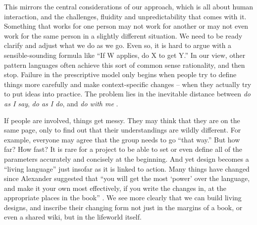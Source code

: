 
This mirrors the central considerations of our approach, which is all about human interaction, and the challenges, fluidity and unpredictability that comes with it.  Something that works for one person may not work for another or may not even work for the same person in a slightly different situation.  We need to be ready clarify and adjust what we do as we go.   Even so, it is hard to argue with a sensible-sounding formula like ``If W applies, do X to get Y.'' In our view, other pattern languages often achieve this sort of common sense rationality, and then stop.  Failure in the prescriptive model only begins when people try to define things more carefully and make context-specific changes -- when they actually try to put ideas into practice.  The problem lies in the inevitable distance between \emph{do as I say}, \emph{do as I do}, and \emph{do with me} \cite[p.~26]{deleuze1994difference}.

If people are involved, things get messy.   They may think that they are on the same page, only to find out that their understandings are wildly different.  For  example, everyone may agree that the group needs to go ``that way.''  But how far?  How fast?  It is rare for a project to be able to set or even define all of the parameters accurately and concisely at the beginning.
And yet design becomes a ``living language'' \cite[p.~xvii]{alexander1977pattern}  just insofar as it is linked to action.  Many things have changed since Alexander suggested that ``you will get the most `power' over the language, and make it your own most effectively, if you write the changes in, at the appropriate places in the book'' \cite[p.~xl]{alexander1977pattern}.  We see more clearly that we can build living designs, and inscribe their changing form not just in the margins of a book, or even a shared wiki, but in the lifeworld itself.  


